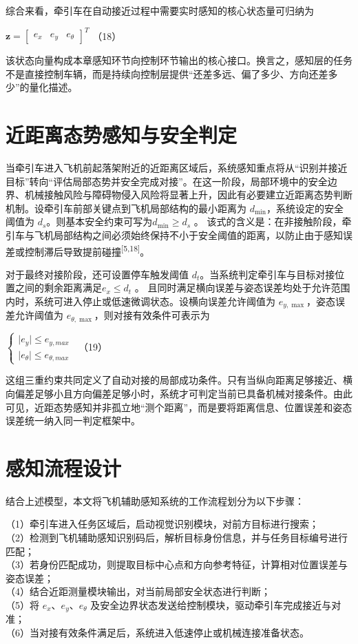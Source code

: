 综合来看，牵引车在自动接近过程中需要实时感知的核心状态量可归纳为

\(\mathbf{z} = \begin{bmatrix}
e_{x} & e_{y} & e_{\theta}
\end{bmatrix}^{T}\) （18）

该状态向量构成本章感知环节向控制环节输出的核心接口。换言之，感知层的任务不是直接控制车辆，而是持续向控制层提供“还差多远、偏了多少、方向还差多少”的量化描述。

\section{近距离态势感知与安全判定}

当牵引车进入飞机前起落架附近的近距离区域后，系统感知重点将从“识别并接近目标”转向“评估局部态势并安全完成对接”。在这一阶段，局部环境中的安全边界、机械接触风险与障碍物侵入风险将显著上升，因此有必要建立近距离态势判断机制。设牵引车前部关键点到飞机局部结构的最小距离为
\(d_{\min}\)，系统设定的安全阈值为
\(d_{s}\)。则基本安全约束可写为\(d_{\min} \geq d_{s}\) 。\(
\)
该式的含义是：在非接触阶段，牵引车与飞机局部结构之间必须始终保持不小于安全阈值的距离，以防止由于感知误差或控制滞后导致提前碰撞\textsuperscript{[5,18]}。

对于最终对接阶段，还可设置停车触发阈值
\(d_{t}\)。当系统判定牵引车与目标对接位置之间的剩余距离满足\(e_{x} \leq d_{t}\)
。\(
\)
且同时满足横向误差与姿态误差均处于允许范围内时，系统可进入停止或低速微调状态。设横向误差允许阈值为
\(e_{y,\max}\)，姿态误差允许阈值为
\(e_{\theta,\max}\)，则对接有效条件可表示为

\(\left\{ \begin{array}{r}
 \mid e_{y} \mid \leq e_{y,max} \\
 \mid e_{\theta} \mid \leq e_{\theta,max}
\end{array} \right.\ \) （19）

这组三重约束共同定义了自动对接的局部成功条件。只有当纵向距离足够接近、横向偏差足够小且方向偏差足够小时，系统才可判定当前已具备机械对接条件。由此可见，近距态势感知并非孤立地“测个距离”，而是要将距离信息、位置误差和姿态误差统一纳入同一判定框架中。

\section{感知流程设计}

结合上述模型，本文将飞机辅助感知系统的工作流程划分为以下步骤：

（1）牵引车进入任务区域后，启动视觉识别模块，对前方目标进行搜索；\\
（2）检测到飞机辅助感知识别码后，解析目标身份信息，并与任务目标编号进行匹配；\\
（3）若身份匹配成功，则提取目标中心点和方向参考特征，计算相对位置误差与姿态误差；\\
（4）结合近距测量模块输出，对当前局部安全状态进行判断；\\
（5）将 \(e_{x}\)、\(e_{y}\)、\(e_{\theta}\)
及安全边界状态发送给控制模块，驱动牵引车完成接近与对准；\\
（6）当对接有效条件满足后，系统进入低速停止或机械连接准备状态。

